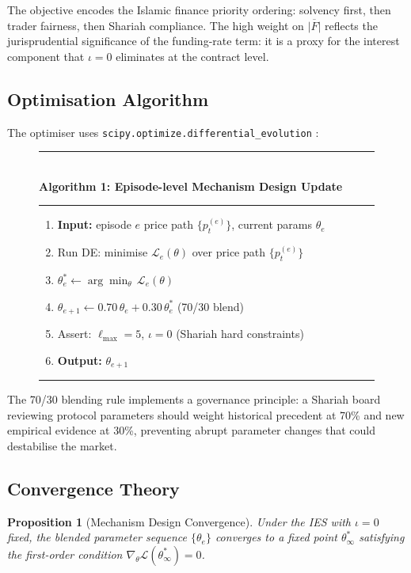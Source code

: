 \documentclass[10pt,twocolumn]{article}
\theoremstyle{plain}
\newtheorem{proposition}{Proposition}
\theoremstyle{definition}
\begin{document}
The objective encodes the Islamic finance priority ordering:
solvency first, then trader fairness, then Shariah compliance.
The high weight on $\overline{|F|}$ reflects the jurisprudential
significance of the funding-rate term: it is a proxy for
the interest component that $\iota=0$ eliminates at the
contract level.

\subsection{Optimisation Algorithm}

The optimiser uses \texttt{scipy.optimize.differential\_evolution}
\cite{Storn1997}:

\begin{figure}[H]
\small
\noindent\rule{\columnwidth}{0.4pt}\\[2pt]
\textbf{Algorithm 1: Episode-level Mechanism Design Update}\\[2pt]
\noindent\rule{\columnwidth}{0.4pt}
\begin{enumerate}[leftmargin=*,noitemsep,label=\arabic{*}.]
  \item \textbf{Input:} episode $e$ price path $\{p_t^{(e)}\}$,
    current params $\theta_e$
  \item Run DE: minimise $\mathcal{L}_e(\theta)$ over
    price path $\{p_t^{(e)}\}$
  \item $\theta^*_e \leftarrow \arg\min_\theta\,\mathcal{L}_e(\theta)$
  \item $\theta_{e+1} \leftarrow 0.70\,\theta_e + 0.30\,\theta^*_e$
    \hfill{\small (70/30 blend)}
  \item Assert: $\ell_{\max} = 5$, $\iota = 0$
    \hfill{\small (Shariah hard constraints)}
  \item \textbf{Output:} $\theta_{e+1}$
\end{enumerate}
\noindent\rule{\columnwidth}{0.4pt}
\caption*{\label{alg:md}}
\end{figure}

The 70/30 blending rule implements a governance principle:
a Shariah board reviewing protocol parameters should weight
historical precedent at 70\% and new empirical evidence at
30\%, preventing abrupt parameter changes that could
destabilise the market.

\subsection{Convergence Theory}

\begin{proposition}[Mechanism Design Convergence]
\label{prop:md_conv}
Under the IES with $\iota=0$ fixed, the blended parameter
sequence $\{\theta_e\}$ converges to a fixed point
$\theta^*_\infty$ satisfying the first-order condition
$\nabla_\theta \mathcal{L}(\theta^*_\infty) = 0$.
\end{proposition}
\end{document}

